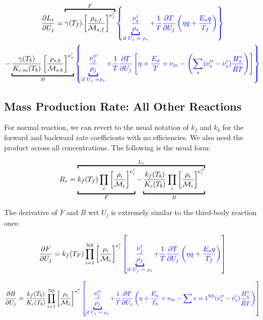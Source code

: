 \documentclass[10pt]{article}
\begin{document}
\begin{flushleft}
\begin{multline}
    \pd{L_r}{U_j} = \overbracket{\gamma(T_f) \bb{\frac{\rho_{s,f}}{\mathcal{M}_{s,f}}}^{\nu_s'}}^{F} \textcolor{blue}{\bcb{ \underbracket{\frac{\nu_s'}{\rho_s}}_{\text{if $U_j$ = $\rho_s$}} + \frac{1}{T} \pd{T}{U_j} \bp{ \eta q + \frac{E_a q}{T_f}} }} 
    \\ -  \underbracket{\frac{\gamma(T_b)}{K_{c,m}(T_b)} \bb{\frac{\rho_{s,b}}{\mathcal{M}_{s,b}}}^{\nu_s'}}_{B}   \textcolor{blue}{ \bcb{\underbracket{\frac{\nu_j''}{\rho_j}}_{\text{if $U_j$ =$\rho_s$}} + \frac{1}{T} \pd{T}{U_j} \bb{ \eta + \frac{E_a}{T} + \nu_m - \bp{\sum_s(\nu_s'' - \nu_s') \frac{H_s^\circ}{\hat{R}T} }}}} 
\end{multline}


\subsection{Mass Production Rate: All Other Reactions}


For normal reaction, we can revert to the usual notation of $k_f$ and $k_b$ for the forward and backward rate coefficients with no efficiencies. We also need the product across all concentrations. The following is the usual form:

\begin{equation}
    R_r = \overbracket{\underbracket{k_f(T_f) \prod_i \bb{\frac{\rho_i}{\mathcal{M}_i}}^{\nu_i'}}_{F} - \underbracket{\frac{k_f(T_b)}{K_c(T_b)} \prod_i \bb{\frac{\rho_i}{\mathcal{M}_i}}^{\nu_i''}}_{B}}^{L_r}
\end{equation}

The derivative of $F$ and $B$ wrt $U_j$ is extremely similar to the third-body reaction ones:

\begin{equation}
    \pd{F}{U_j} = k_f(T_F) \prod_{i=1}^\text{NS} \bb{\frac{\rho_i}{\mathcal{M}_i}}^{\nu_i'} \textcolor{blue}{\bb{ \underbracket{\frac{\nu_j'}{\rho_j}}_{\text{if $U_j$ = $\rho_i$}} + \frac{1}{T} \pd{T}{U_j} \bp{\eta q + \frac{E_a q}{T_f}} }}
\end{equation}

\begin{multline}
    \pd{B}{U_j} = \frac{k_f(T_b)}{K_c(T_b)} \prod_{i=1}^\text{NS} \bb{\frac{\rho_i}{\mathcal{M}_i}}^{\nu_i''} \textcolor{blue}{ \bb{\underbracket{\frac{\nu_j''}{\rho_j}}_{\text{if $U_j$ = $\rho_j$}} + \frac{1}{T} \pd{T}{U_j} \bp{\eta + \frac{E_a}{T_b} + \nu_m - \sum{s=1}^\text{NS} (\nu_s'' - \nu_s') \frac{H_s^\circ}{\hat{R}T}} }}
\end{multline}


\end{flushleft}
\end{document}
